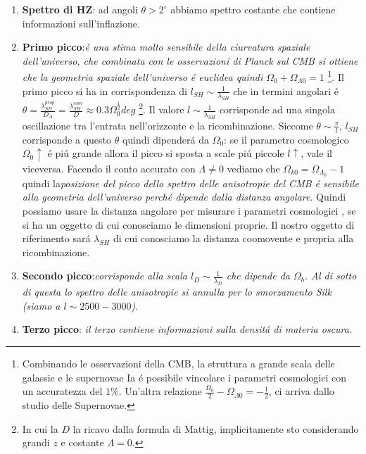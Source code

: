 \documentclass[12pt, a4paper]{article}
\begin{document}
\begin{enumerate}
\item\textbf{ Spettro di HZ}: ad angoli $\theta> 2^{\circ}$ abbiamo spettro costante che contiene informazioni sull'inflazione.
\item \textbf{Primo picco}:\textit{\'{e} una stima molto sensibile della ciurvatura spaziale dell'universo, che combinata con le osservazioni di Planck sul CMB si ottiene che la geometria spaziale dell'universo \'{e} euclidea quindi $\Omega_0+\Omega_{\Lambda0}=1$} \footnote{Combinando le osservazioni della CMB, la struttura a grande scala delle galassie e le supernovae Ia \'{e} possibile vincolare i parametri cosmologici con un accuratezza del $1\%$. Un'altra relazione $\frac{\Omega_0}{2}-\Omega_{\Lambda0}=-\frac{1}{2}$, ci arriva dallo studio delle Supernovae.}. Il primo picco si ha in corrispondenza di $l_{SH}\sim \frac{1}{\lambda_{SH}}$ che in termini angolari \'{e} $\theta=\frac{\lambda_{SH}^{prop}}{D_{A}}=\frac{\lambda_{SH}^{com}}{D}\approx 0.3 \Omega_0^{\frac{1}{2}}deg$ \footnote{In cui la $D$ la ricavo dalla formula di Mattig, implicitamente sto considerando grandi $z$ e costante $\Lambda=0$.}. Il valore $l\sim \frac{1}{\lambda_{SH}}$ corrisponde ad una singola oscillazione tra l'entrata nell'orizzonte e la ricombinazione.  Siccome $\theta \sim \frac{\pi}{l}$, $l_{SH}$ corrisponde a questo $\theta$ quindi dipender\'{a} da $\Omega_0$: se il parametro cosmologico $\Omega_0 \uparrow$ \'{e} pi\'{u} grande allora il picco si sposta a scale pi\'{u} piccole $l\uparrow$, vale il viceversa. Facendo il conto accurato con $\Lambda \neq 0$  vediamo che  $\Omega_{k0}=\Omega_{\Lambda_0}-1$ quindi la\textit{posizione del picco dello spettro delle anisotropie del CMB \'{e} sensibile alla geometria dell'universo perch\'{e} dipende dalla distanza angolare}. Quindi possiamo usare la distanza angolare per misurare i parametri cosmologici , se si ha un oggetto di cui conosciamo le dimensioni proprie. Il nostro oggetto di riferimento sar\'{a} $\lambda_{SH}$ di cui conosciamo la distanza coomovente e propria alla ricombinazione.
\item \textbf{Secondo picco}:\textit{corrisponde alla scala $l_{D}\sim \frac{1}{\lambda_D}$ che dipende da $\Omega_b$. Al di sotto di questa lo spettro delle anisotropie si annulla per lo smorzamento Silk (siamo a $l\sim 2500-3000$).}\\
\item \textbf{Terzo picco}: \textit{il terzo contiene informazioni sulla densit\'{a} di materia oscura}.
\end{enumerate}
\end{document}
